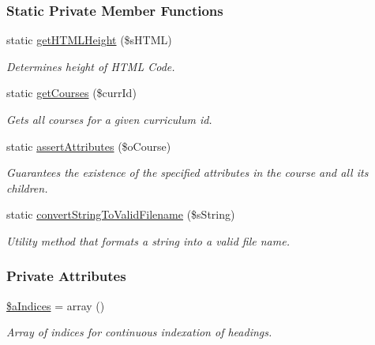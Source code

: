 \subsubsection*{Static Private Member Functions}
\begin{DoxyCompactItemize}
\item 
static \hyperlink{classoverview_p_d_f_af41675b946292789cecd9416ca809bcc}{get\+H\+T\+M\+L\+Height} (\$s\+H\+T\+M\+L)
\begin{DoxyCompactList}\small\item\em Determines height of H\+T\+M\+L Code. \end{DoxyCompactList}\item 
static \hyperlink{classoverview_p_d_f_a921bc685431e16db85dc8ef8491f90a4}{get\+Courses} (\$curr\+Id)
\begin{DoxyCompactList}\small\item\em Gets all courses for a given curriculum id. \end{DoxyCompactList}\item 
static \hyperlink{classoverview_p_d_f_a56f3ef341ae39bb7b4c34a700b33eac1}{assert\+Attributes} (\$o\+Course)
\begin{DoxyCompactList}\small\item\em Guarantees the existence of the specified attributes in the course and all its children. \end{DoxyCompactList}\item 
static \hyperlink{classoverview_p_d_f_ab867930d00ec2effc61f252de44b04fe}{convert\+String\+To\+Valid\+Filename} (\$s\+String)
\begin{DoxyCompactList}\small\item\em Utility method that formats a string into a valid file name. \end{DoxyCompactList}\end{DoxyCompactItemize}
\subsubsection*{Private Attributes}
\begin{DoxyCompactItemize}
\item 
\hyperlink{classoverview_p_d_f_a7d055132da646af2b192923c6a864e97}{\$a\+Indices} = array ()
\begin{DoxyCompactList}\small\item\em Array of indices for continuous indexation of headings. \end{DoxyCompactList}\end{DoxyCompactItemize}


